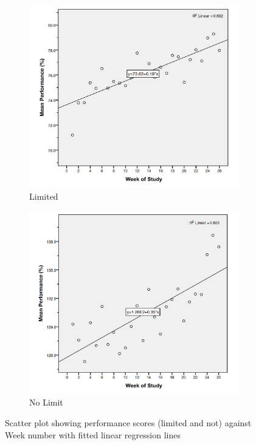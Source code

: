 \begin{figure}[h]
    \centering
    \begin{subfigure}[t]{0.48\textwidth}
        \centering
        \includegraphics[width=\textwidth]{Files/prevention-study-3/figures/performance-linear-limit}
        \caption{Limited}
        \label{fig: performance-linear-limit}
    \end{subfigure}
    \hfill
    \begin{subfigure}[t]{0.48\textwidth}
        \centering
        \includegraphics[width=\textwidth]{Files/prevention-study-3/figures/performance-linear-nolimit}
        \caption{No Limit}
        \label{fig: performance-linear-nolimit}
    \end{subfigure}
    \caption{Scatter plot showing performance scores (limited and not) against Week number with fitted linear regression lines}
    \label{fig: performance-linear-limitcomparison}
\end{figure}

